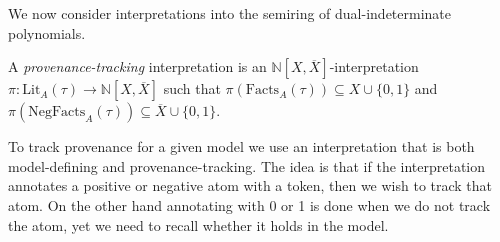 \documentclass[oneside, 11pt]{amsbook}
\theoremstyle{plain}
\theoremstyle{definition}
\theoremstyle{remark}
\begin{document}
We now consider interpretations into the semiring of dual-indeterminate polynomials.

\begin{defn}
    A \emph{provenance-tracking} interpretation is an $\mathbb{N}[X,\overline{X}]$-interpretation $\pi : \mathrm{Lit}_{A}(\tau) \to \mathbb{N}[X,\overline{X}]$ such that $\pi(\mathrm{Facts}_A(\tau)) \subseteq X \cup \{0,1\}$ and $\pi(\mathrm{NegFacts}_A(\tau)) \subseteq \overline{X} \cup \{0,1\}$.
\end{defn}

To track provenance for a given model we use an interpretation that is both model-defining and provenance-tracking. The idea is that if the interpretation annotates a positive or negative atom with a token, then we wish to track that atom. On the other hand annotating with 0 or 1 is done when we do not track the atom, yet we need to recall whether it holds in the model.
\end{document}
